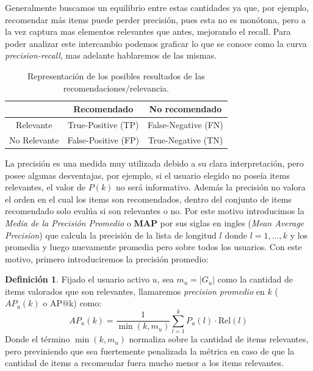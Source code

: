\documentclass[hidelinks,12pt,a4paper]{book}
\theoremstyle{plain}
\theoremstyle{definition}
\newtheorem{definicion}[theorem]{Definición} %
\begin{document}
Generalmente buscamos un equilibrio entre estas cantidades ya que, por ejemplo, recomendar más items puede perder precisión, pues esta no es monótona, pero a la vez captura mas elementos relevantes que antes, mejorando el recall. Para poder analizar este intercambio podemos graficar lo que se conoce como la curva \textit{precision-recall}, mas adelante hablaremos de las mismas. 

\begin{table}[htb]
\begin{center}
\begin{tabular}{|c|c|c|}
\hline
  & Recomendado & No recomendado \\
\hline
Relevante & True-Positive (TP) & False-Negative (FN)\\
\hline
No Relevante & False-Positive (FP) & True-Negative (TN)\\
\hline
\end{tabular}
\caption{Representación de los posibles resultados de las recomendaciones/relevancia.}\label{t:recomvsrel}
\end{center}
\end{table}

La precisión es una medida muy utilizada debido a su clara interpretación, pero posee algunas desventajas, por ejemplo, si el usuario elegido no poseía items relevantes, el valor de $P(k)$ no será informativo. Además la precisión no valora el orden en el cual los items son recomendados, dentro del conjunto de items recomendado solo evalúa si son relevantes o no. Por este motivo introducimos la \textit{Media de la Precisión Promedio} o \textbf{MAP} por sus siglas en ingles (\textit{Mean Average Precision}) que calcula la precisión de la lista de longitud $l$ donde $l=1,\ldots, k$ y los promedia y luego nuevamente promedia pero sobre todos los usuarios. Con este motivo, primero introduciremos la precisión promedio:

\begin{definicion}
Fijado el usuario activo $u$, sea $m_{u}=|G_u|$ como la cantidad de items valorados que son relevantes, llamaremos \textit{precision promedio} en $k$ ($AP_u(k)$ o AP@k) como:
\begin{equation}
AP_u(k)= \frac{1}{\min(k,m_{u})} \sum_{l=1}^{k} P_{u}(l) \cdot \text{Rel}(l)
\end{equation}
Donde el término $\min(k,m_{u})$ normaliza sobre la cantidad de items relevantes, pero previniendo que sea fuertemente penalizada la métrica en caso de que la cantidad de items a recomendar fuera mucho menor a los items relevantes.
\end{definicion}
\end{document}
